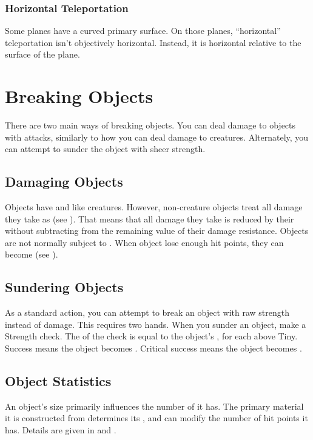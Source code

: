     \subsubsection{Horizontal Teleportation}
      Some planes have a curved primary surface.
      On those planes, ``horizontal'' teleportation isn't objectively horizontal.
      Instead, it is horizontal relative to the surface of the plane.

\section{Breaking Objects}
  There are two main ways of breaking objects.
  You can deal damage to objects with attacks, similarly to how you can deal damage to creatures.
  Alternately, you can attempt to sunder the object with sheer strength.

  \subsection{Damaging Objects}
    Objects have  and  like creatures.
    However, non-creature objects treat all damage they take as  (see ).
    That means that all damage they take is reduced by their  without subtracting from the remaining value of their damage resistance.
    Objects are not normally subject to .
    When object lose enough hit points, they can become  (see ).

  \subsection{Sundering Objects}
    As a standard action, you can attempt to break an object with raw strength instead of damage.
    This requires two hands.
    When you sunder an object, make a Strength check.
    The  of the check is equal to the object's ,  for each  above Tiny.
    Success means the object becomes .
    Critical success means the object becomes .

  \subsection{Object Statistics}
    An object's size primarily influences the number of  it has.
    The primary material it is constructed from determines its , and can modify the number of hit points it has.
    Details are given in  and .

